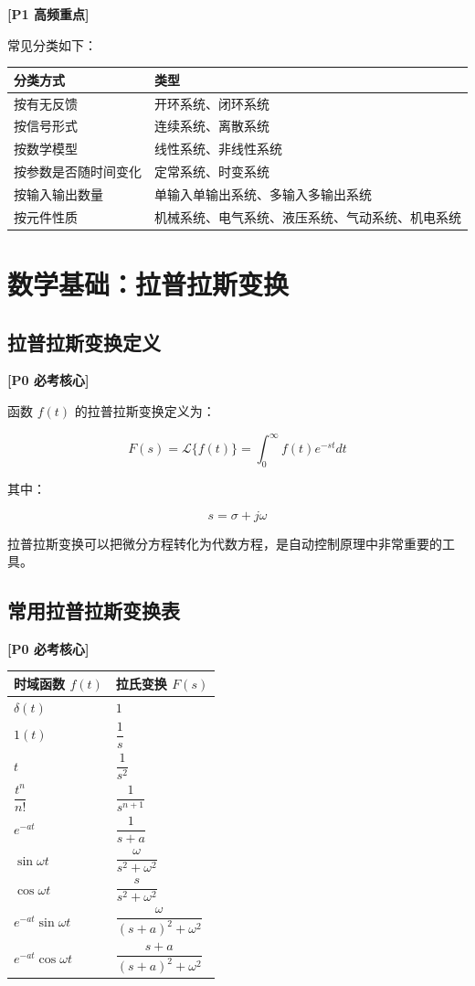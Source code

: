 \documentclass[UTF8,a4paper,12pt]{ctexart}
\newcommand{\Pzero}{\textcolor{p0}{\textbf{[P0 必考核心]}}}
\newcommand{\Pone}{\textcolor{p1}{\textbf{[P1 高频重点]}}}
\begin{document}
\Pone

常见分类如下：

\begin{longtable}{p{4cm}p{10cm}}
\toprule
分类方式 & 类型 \\
\midrule
按有无反馈 & 开环系统、闭环系统 \\
按信号形式 & 连续系统、离散系统 \\
按数学模型 & 线性系统、非线性系统 \\
按参数是否随时间变化 & 定常系统、时变系统 \\
按输入输出数量 & 单输入单输出系统、多输入多输出系统 \\
按元件性质 & 机械系统、电气系统、液压系统、气动系统、机电系统 \\
\bottomrule
\end{longtable}

\section{数学基础：拉普拉斯变换}

\subsection{拉普拉斯变换定义}

\Pzero

函数 $f(t)$ 的拉普拉斯变换定义为：

\[
F(s)=\mathcal{L}\{f(t)\}=\int_{0}^{\infty} f(t)e^{-st}dt
\]

其中：

\[
s=\sigma+j\omega
\]

拉普拉斯变换可以把微分方程转化为代数方程，是自动控制原理中非常重要的工具。

\subsection{常用拉普拉斯变换表}

\Pzero

\begin{longtable}{p{5cm}p{7cm}}
\toprule
时域函数 $f(t)$ & 拉氏变换 $F(s)$ \\
\midrule
$\delta(t)$ & $1$ \\
$1(t)$ & $\dfrac{1}{s}$ \\
$t$ & $\dfrac{1}{s^2}$ \\
$\dfrac{t^n}{n!}$ & $\dfrac{1}{s^{n+1}}$ \\
$e^{-at}$ & $\dfrac{1}{s+a}$ \\
$\sin \omega t$ & $\dfrac{\omega}{s^2+\omega^2}$ \\
$\cos \omega t$ & $\dfrac{s}{s^2+\omega^2}$ \\
$e^{-at}\sin \omega t$ & $\dfrac{\omega}{(s+a)^2+\omega^2}$ \\
$e^{-at}\cos \omega t$ & $\dfrac{s+a}{(s+a)^2+\omega^2}$ \\
\bottomrule
\end{longtable}
\end{document}
